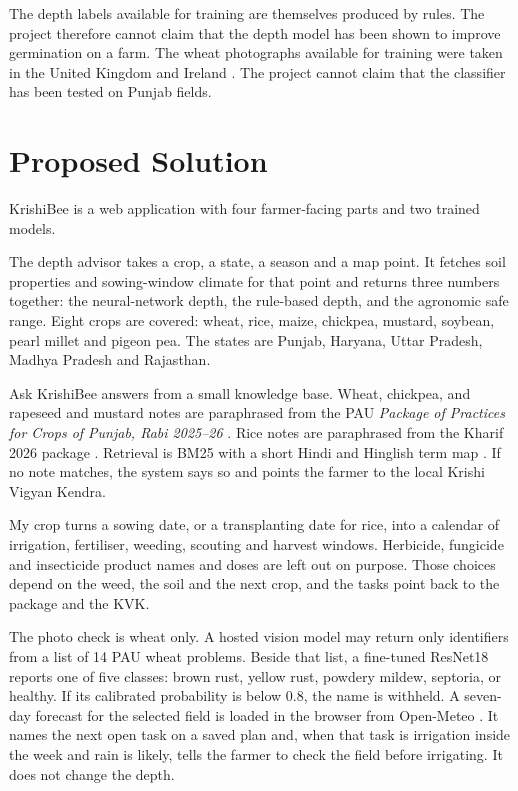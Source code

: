 The depth labels available for training are themselves produced by rules. The project therefore cannot claim that the depth model has been shown to improve germination on a farm. The wheat photographs available for training were taken in the United Kingdom and Ireland \cite{long2023wheat,long2023data}. The project cannot claim that the classifier has been tested on Punjab fields.

\section{Proposed Solution}
KrishiBee is a web application with four farmer-facing parts and two trained models.

The depth advisor takes a crop, a state, a season and a map point. It fetches soil properties and sowing-window climate for that point and returns three numbers together: the neural-network depth, the rule-based depth, and the agronomic safe range. Eight crops are covered: wheat, rice, maize, chickpea, mustard, soybean, pearl millet and pigeon pea. The states are Punjab, Haryana, Uttar Pradesh, Madhya Pradesh and Rajasthan.

Ask KrishiBee answers from a small knowledge base. Wheat, chickpea, and rapeseed and mustard notes are paraphrased from the PAU \emph{Package of Practices for Crops of Punjab, Rabi 2025--26} \cite{pau2025rabi}. Rice notes are paraphrased from the Kharif 2026 package \cite{pau2026kharif}. Retrieval is BM25 with a short Hindi and Hinglish term map \cite{robertson2009bm25}. If no note matches, the system says so and points the farmer to the local Krishi Vigyan Kendra.

My crop turns a sowing date, or a transplanting date for rice, into a calendar of irrigation, fertiliser, weeding, scouting and harvest windows. Herbicide, fungicide and insecticide product names and doses are left out on purpose. Those choices depend on the weed, the soil and the next crop, and the tasks point back to the package and the KVK.

The photo check is wheat only. A hosted vision model may return only identifiers from a list of 14 PAU wheat problems. Beside that list, a fine-tuned ResNet18 \cite{he2016resnet} reports one of five classes: brown rust, yellow rust, powdery mildew, septoria, or healthy. If its calibrated probability is below 0.8, the name is withheld. A seven-day forecast for the selected field is loaded in the browser from Open-Meteo \cite{openmeteo}. It names the next open task on a saved plan and, when that task is irrigation inside the week and rain is likely, tells the farmer to check the field before irrigating. It does not change the depth.

